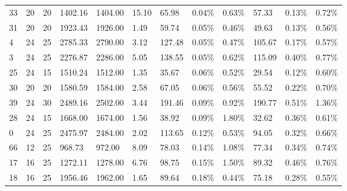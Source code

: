 \documentclass[../main]{subfiles}
\begin{document}
\begin{longtable}{l|ll|lll|lll|lll}
   33 & 20                         & 20                         & 1402.16                   & 1404.00  & 15.10               & 65.98  & 0.04\%  & 0.63\% & 57.33  & 0.13\%  & 0.72\% \\
   31 & 20                         & 20                         & 1923.43                   & 1926.00  & 1.49                & 59.74  & 0.05\%  & 0.46\% & 49.63  & 0.13\%  & 0.56\% \\
   4  & 24                         & 25                         & 2785.33                   & 2790.00  & 3.12                & 127.48 & 0.05\%  & 0.47\% & 105.67 & 0.17\%  & 0.57\% \\
   3  & 24                         & 25                         & 2276.87                   & 2286.00  & 5.05                & 138.55 & 0.05\%  & 0.62\% & 115.09 & 0.40\%  & 0.77\% \\
   25 & 24                         & 15                         & 1510.24                   & 1512.00  & 1.35                & 35.67  & 0.06\%  & 0.52\% & 29.54  & 0.12\%  & 0.60\% \\
   30 & 20                         & 20                         & 1580.59                   & 1584.00  & 2.58                & 67.05  & 0.06\%  & 0.56\% & 55.52  & 0.22\%  & 0.70\% \\
   39 & 24                         & 30                         & 2489.16                   & 2502.00  & 3.44                & 191.46 & 0.09\%  & 0.92\% & 190.77 & 0.51\%  & 1.36\% \\
   28 & 24                         & 15                         & 1668.00                   & 1674.00  & 1.56                & 38.92  & 0.09\%  & 1.80\% & 32.62  & 0.36\%  & 0.61\% \\
   0  & 24                         & 25                         & 2475.97                   & 2484.00  & 2.02                & 113.65 & 0.12\%  & 0.53\% & 94.05  & 0.32\%  & 0.66\% \\
   66 & 12                         & 25                         & 968.73                    & 972.00   & 8.09                & 78.03  & 0.14\%  & 1.08\% & 77.34  & 0.34\%  & 0.74\% \\
   17 & 16                         & 25                         & 1272.11                   & 1278.00  & 6.76                & 98.75  & 0.15\%  & 1.50\% & 89.32  & 0.46\%  & 0.76\% \\
   18 & 16                         & 25                         & 1956.46                   & 1962.00  & 1.65                & 89.64  & 0.18\%  & 0.44\% & 75.18  & 0.28\%  & 0.55\% \\

\end{longtable}
\end{document}
